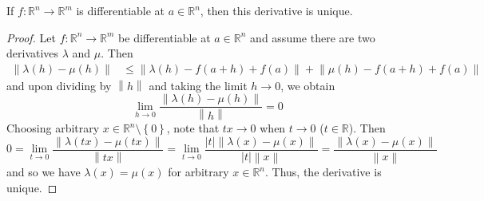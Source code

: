\begin{prop}
If $f:\mathbb{R}^n \rightarrow \mathbb{R}^m$ is differentiable at $a\in \mathbb{R}^n$, then this derivative is unique.
\end{prop}
\begin{proof}
	Let $f:\mathbb{R}^n \rightarrow \mathbb{R}^m$ be differentiable at $a \in \mathbb{R}^n$ and assume there are two derivatives $\lambda$ and $\mu$. Then 
	\begin{align*}
		\left\lVert \lambda\left(h\right) - \mu\left(h\right) \right\rVert & \leq \left\lVert \lambda\left(h\right) - f\left(a+h\right) + f\left(a\right) \right\rVert + \left\lVert \mu\left(h\right) - f\left(a+h\right) + f\left(a\right) \right\rVert
	\end{align*}
	and upon dividing by $\left\lVert h \right\rVert $ and taking the limit $h \rightarrow 0$, we obtain \[ \lim_{h\rightarrow 0} \frac{\left\lVert \lambda\left(h\right) - \mu\left(h\right) \right\rVert }{\left\lVert h \right\rVert } = 0 \]
	Choosing arbitrary $x \in \mathbb{R}^n\setminus \left\{ 0 \right\} $, note that $tx \rightarrow 0 $ when $t \rightarrow 0$ ($t \in \mathbb{R}$). Then \[ 0 = \lim_{t\rightarrow 0} \frac{\left\lVert \lambda\left(tx\right) - \mu\left(tx\right) \right\rVert }{\left\lVert tx \right\rVert } = \lim_{t\rightarrow 0} \frac{\left| t\right| \left\lVert \lambda\left(x\right) - \mu\left(x\right) \right\rVert }{\left| t \right| \left\lVert x \right\rVert } = \frac{\left\lVert \lambda\left(x\right) - \mu\left(x\right) \right\rVert }{\left\lVert x \right\rVert } \] and so we have $\lambda\left(x\right) = \mu \left(x\right)$ for arbitrary $x\in \mathbb{R}^n$. Thus, the derivative is unique.
\end{proof}

